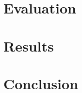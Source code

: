 \documentclass[
	paper=A4,
    titlepage=true,
	fontsize=11pt,
	parskip=half
]{scrreprt}
\begin{document}

	\chapter{Evaluation} {
	\label{ch:evaluation}
		
	}


	\chapter{Results} {
	\label{ch:results}
		
	}


	\chapter{Conclusion} {
	\label{ch:conclusion}
		
	}
	
	\renewcommand{\bibname}{References}
	\printbibliography[notcategory=exclude]
	
\end{document}
